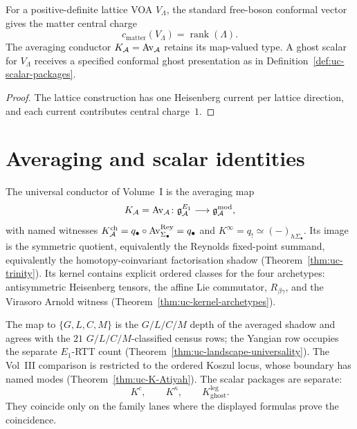 \begin{corollary}
\label{cor:uc-K-lattice}
\ClaimStatusProvedHere
For a positive-definite lattice VOA $V_\Lambda$, the standard
free-boson conformal vector gives the matter central charge
\[
 c_{\mathrm{matter}}(V_\Lambda)=\operatorname{rank}(\Lambda).
\]
The averaging conductor $K_{\mathcal{A}}=\operatorname{Av}_{\mathcal{A}}$ retains its map-valued type.
A ghost scalar for $V_\Lambda$ receives a specified conformal ghost
presentation as in Definition~\ref{def:uc-scalar-packages}.
\end{corollary}

\begin{proof}
The lattice construction has one Heisenberg current per lattice
direction, and each current contributes central charge~$1$.
\end{proof}

\section{Averaging and scalar identities}
\label{sec:uc-identities}

The universal conductor of Volume~I is the averaging map
\[
 K_{\mathcal{A}}=\operatorname{Av}_{\mathcal{A}}\colon \mathfrak{g}_{\mathcal{A}}^{E_1}\longrightarrow \mathfrak{g}_{\mathcal{A}}^{\mathrm{mod}},
\]
with named witnesses
$K_{\mathcal{A}}^{\mathrm{ch}}
=q_\bullet\circ\operatorname{Av}^{\mathrm{Rey}}_{\Sigma_\bullet}=q_\bullet$
and $K^\infty=q_!\simeq(-)_{h\Sigma_\bullet}$. Its image is the
symmetric quotient, equivalently the Reynolds fixed-point summand,
equivalently the homotopy-coinvariant factorisation shadow
(Theorem~\ref{thm:uc-trinity}). Its kernel contains explicit ordered
classes for the four archetypes:
antisymmetric Heisenberg tensors, the affine Lie commutator,
$R_{\beta\gamma}$, and the Virasoro Arnold witness
(Theorem~\ref{thm:uc-kernel-archetypes}).

The map to $\{G,L,C,M\}$ is the $G/L/C/M$ depth of the averaged shadow
and agrees with the $21$ $G/L/C/M$-classified census rows; the Yangian row
occupies the separate $E_1$-RTT count
(Theorem~\ref{thm:uc-landscape-universality}). The Vol~III comparison
is restricted to the ordered Koszul locus, whose boundary has named
modes (Theorem~\ref{thm:uc-K-Atiyah}). The scalar packages are
separate:
\[
 K^c,\qquad K^\kappa,\qquad K_{\mathrm{ghost}}^{\mathrm{leg}}.
\]
They coincide only on the family lanes where the displayed formulas
prove the coincidence.
